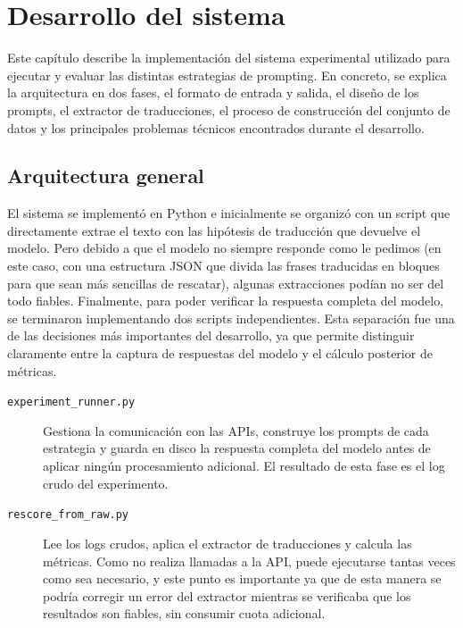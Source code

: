 \chapter{Desarrollo del sistema}
\label{cap:desarrollo}

Este capítulo describe la implementación del sistema experimental utilizado para ejecutar y evaluar las distintas estrategias de prompting. En concreto, se explica la arquitectura en dos fases, el formato de entrada y salida, el diseño de los prompts, el extractor de traducciones, el proceso de construcción del conjunto de datos y los principales problemas técnicos encontrados durante el desarrollo.

\section{Arquitectura general}
\label{sec:arquitectura-general}

El sistema se implementó en Python e inicialmente se organizó con un script que directamente extrae el texto con las hipótesis de traducción que devuelve el modelo. Pero debido a que el modelo no siempre responde como le pedimos (en este caso, con una estructura JSON que divida las frases traducidas en bloques para que sean más sencillas de rescatar), algunas extracciones podían no ser del todo fiables. Finalmente, para poder verificar la respuesta completa del modelo, se terminaron implementando dos scripts independientes. Esta separación fue una de las decisiones más importantes del desarrollo, ya que permite distinguir claramente entre la captura de respuestas del modelo y el cálculo posterior de métricas.

\begin{description}
	\item[\texttt{experiment\_runner.py}] Gestiona la comunicación con las APIs, construye los prompts de cada estrategia y guarda en disco la respuesta completa del modelo antes de aplicar ningún procesamiento adicional. El resultado de esta fase es el log crudo del experimento.
	
	\item[\texttt{rescore\_from\_raw.py}] Lee los logs crudos, aplica el extractor de traducciones y calcula las métricas. Como no realiza llamadas a la API, puede ejecutarse tantas veces como sea necesario, y este punto es importante ya que de esta manera se podría corregir un error del extractor mientras se verificaba que los resultados son fiables, sin consumir cuota adicional.
\end{description}


